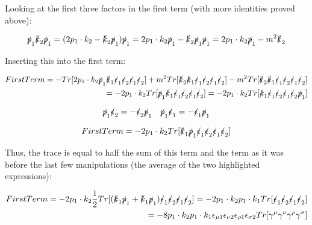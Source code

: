 \documentclass[a4]{article}
\begin{document}
    Looking at the first three factors in the first term (with more identities proved above):

    \begin{equation}
        \slashed{p}_1 \slashed{k}_2 \slashed{p}_1 = (2 p_1 \cdot k_2 - \slashed{k}_2 \slashed{p}_1) \slashed{p}_1 = 2 p_1 \cdot k_2 \slashed{p}_1 - \slashed{k}_2 \slashed{p}_1 \slashed{p}_1 = 2 p_1 \cdot k_2 \slashed{p}_1 - m^2 \slashed{k}_2
    \end{equation}

    Inserting this into the first term:

    \begin{eqnarray}
        First Term = - Tr [2 p_1 \cdot k_2 \slashed{p}_1 \slashed{k}_1 \slashed{\epsilon}_1 \slashed{\epsilon}_2 \slashed{\epsilon}_1 \slashed{\epsilon}_2] + m^2 Tr [\slashed{k}_2 \slashed{k}_1 \slashed{\epsilon}_1 \slashed{\epsilon}_2 \slashed{\epsilon}_1 \slashed{\epsilon}_2] - m^2 Tr [\slashed{k}_2 \slashed{k}_1 \slashed{\epsilon}_1 \slashed{\epsilon}_2 \slashed{\epsilon}_1 \slashed{\epsilon}_2] \\
        = - 2 p_1 \cdot k_2 Tr [\slashed{p}_1 \slashed{k}_1 \slashed{\epsilon}_1 \slashed{\epsilon}_2 \slashed{\epsilon}_1 \slashed{\epsilon}_2] = - 2 p_1 \cdot k_2 Tr [\slashed{k}_1 \slashed{\epsilon}_1 \slashed{\epsilon}_2 \slashed{\epsilon}_1 \slashed{\epsilon}_2 \slashed{p}_1]
    \end{eqnarray}

    \[
        \slashed{p}_1 \slashed{\epsilon}_2 = - \slashed{\epsilon}_2 \slashed{p}_1 \quad \slashed{p}_1 \slashed{\epsilon}_1 = - \slashed{\epsilon}_1 \slashed{p}_1
    \]

    \begin{equation}
        First Term = -2 p_1 \cdot k_2 Tr [\slashed{k}_1 \slashed{p}_1 \slashed{\epsilon}_1 \slashed{\epsilon}_2 \slashed{\epsilon}_1 \slashed{\epsilon}_2]
    \end{equation}

    Thus, the trace is equal to half the sum of this term and the term as it was before the last few manipulations (the average of the two highlighted expressions):

    \begin{eqnarray}
        First Term = -2 p_1 \cdot k_2 \frac{1}{2} Tr [(\slashed{k}_1 \slashed{p}_1 + \slashed{k}_1 \slashed{p}_1) \slashed{\epsilon}_1 \slashed{\epsilon}_2 \slashed{\epsilon}_1 \slashed{\epsilon}_2] = -2 p_1 \cdot k_2 p_1 \cdot k_1 Tr [\slashed{\epsilon}_1 \slashed{\epsilon}_2 \slashed{\epsilon}_1 \slashed{\epsilon}_2] \\
        = - 8 p_1 \cdot k_2 p_1 \cdot k_1 \epsilon_{\mu 1} \epsilon_{\nu 2} \epsilon_{\rho 1} \epsilon_{\sigma 2} Tr [\gamma^\mu \gamma^\nu \gamma^\rho \gamma^\sigma]
    \end{eqnarray}
\end{document}
